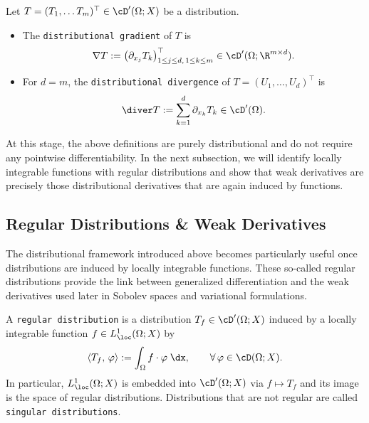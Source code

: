 \begin{definition}
	Let $T = (T_1,\ldots T_m)^\top\in\cD^\prime(\Omega;X)$ be a distribution.
	\begin{itemize}
		\item[i)] The {\tt distributional gradient} of $T$ is
		      \begin{equation*}
			      \nabla T:= \left(\partial_{x_j}T_k\right)_{1\le j\le d,\,1\le k\le m}^\top \in \cD^\prime(\Omega;\R^{m\times d}).
		      \end{equation*}
		\item[ii)] For $d = m$, the {\tt distributional divergence} of $T =(U_1,\ldots, U_d)^\top$ is
		      \begin{equation*}
			      \diver T:= \sum_{k = 1}^d\partial_{x_k} T_k\in\cD^\prime(\Omega).
		      \end{equation*}
	\end{itemize}
\end{definition}

At this stage, the above definitions are purely distributional and do not require any pointwise differentiability. In the next subsection, we will identify locally integrable functions with regular distributions and show that weak derivatives are precisely those distributional derivatives that are again induced by functions.

\subsection{Regular Distributions \& Weak Derivatives}

The distributional framework introduced above becomes particularly useful once distributions are induced by locally integrable functions. These so-called regular distributions provide the link between generalized differentiation and the weak derivatives used later in Sobolev spaces and variational formulations.

\begin{definition}
	A {\tt regular distribution} is a distribution $T_f\in\cD^\prime(\Omega;X)$ induced by a locally integrable function $f\in L^1_{\loc}(\Omega;X)$ by
	\begin{equation*}
		\langle T_f,\,\varphi\rangle := \int_\Omega f\cdot \varphi\;\dx ,\qquad \forall\,\varphi\in\cD(\Omega;X).
	\end{equation*}
	In particular, $L^1_\loc(\Omega;X)$ is embedded into $\cD^\prime(\Omega;X)$ via $f\mapsto T_f$ and its image is the space of regular distributions. Distributions that are not regular are called {\tt singular distributions}.
\end{definition}

